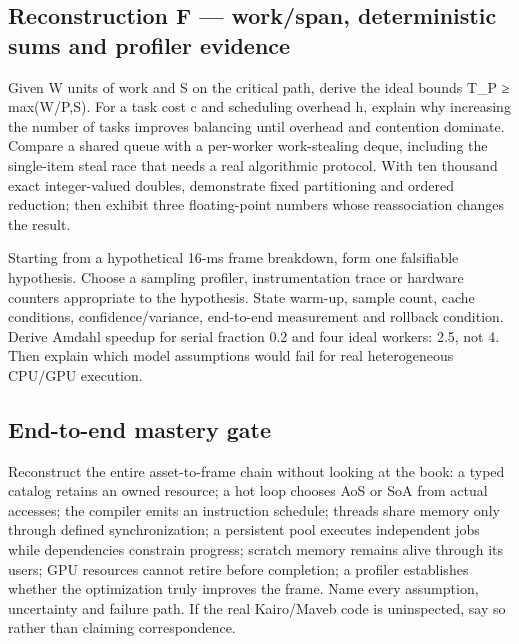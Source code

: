 \subsection{Reconstruction F --- work/span, deterministic sums and profiler evidence}\label{appendix-2587680a4fe3-reconstruction-f-workspan-deterministic-sums-and-profiler-evidence}

\hypertarget{appendix-2587680a4fe3-reconstruction-f-workspan-deterministic-sums-and-profiler-evidence}{}

Given W units of work and S on the critical path, derive the ideal bounds T\_P ≥ max(W/P,S). For a task cost c and scheduling overhead h, explain why increasing the number of tasks improves balancing until overhead and contention dominate. Compare a shared queue with a per-worker work-stealing deque, including the single-item steal race that needs a real algorithmic protocol. With ten thousand exact integer-valued doubles, demonstrate fixed partitioning and ordered reduction; then exhibit three floating-point numbers whose reassociation changes the result.

Starting from a hypothetical 16-ms frame breakdown, form one falsifiable hypothesis. Choose a sampling profiler, instrumentation trace or hardware counters appropriate to the hypothesis. State warm-up, sample count, cache conditions, confidence/variance, end-to-end measurement and rollback condition. Derive Amdahl speedup for serial fraction 0.2 and four ideal workers: 2.5, not 4. Then explain which model assumptions would fail for real heterogeneous CPU/GPU execution.

\subsection{End-to-end mastery gate}\label{appendix-2587680a4fe3-end-to-end-mastery-gate}

\hypertarget{appendix-2587680a4fe3-end-to-end-mastery-gate}{}

Reconstruct the entire asset-to-frame chain without looking at the book: a typed catalog retains an owned resource; a hot loop chooses AoS or SoA from actual accesses; the compiler emits an instruction schedule; threads share memory only through defined synchronization; a persistent pool executes independent jobs while dependencies constrain progress; scratch memory remains alive through its users; GPU resources cannot retire before completion; a profiler establishes whether the optimization truly improves the frame. Name every assumption, uncertainty and failure path. If the real Kairo/Maveb code is uninspected, say so rather than claiming correspondence.

